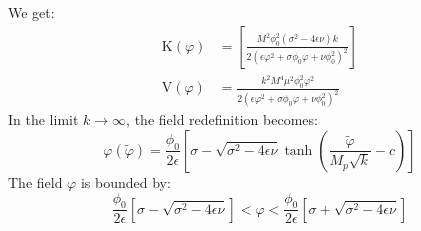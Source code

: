 \documentclass[aps,prd,reprint,preprintnumbers,showpacs,floatfix,nofootinbib,superscript address]{revtex4-2}
\begin{document}
We get:
\begin{align}
    \text{K}(\varphi) &= \left[\frac{M^2 \phi_0^2 (\sigma^2 - 4\epsilon\nu)k}{2 (\epsilon \varphi^2 + \sigma\phi_0\varphi + \nu \phi_0^2)^2}\right] \label{C4}  \\
    \text{V}(\varphi) &= \frac{ k^2 M^4 \mu^2 \phi^2_0 \varphi^2}{2(\epsilon \varphi^2 + \sigma\phi_0\varphi + \nu \phi_0^2)^2}
\end{align}
In the limit $k \rightarrow\infty$, the field redefinition becomes:
\begin{equation}
    \varphi(\tilde{\varphi}) = \frac{\phi_0}{2\epsilon} \left[\sigma - \sqrt{\sigma^2 - 4\epsilon \nu} \tanh\left(\frac{\tilde{\varphi}}{M_p\sqrt{k}}-c \right) \right]
\end{equation}
The field $\varphi$ is bounded by:
\begin{equation}
    \frac{\phi_0}{2\epsilon} \left[\sigma - \sqrt{\sigma^2 - 4\epsilon \nu}\right] < \varphi < \frac{\phi_0}{2\epsilon} \left[\sigma + \sqrt{\sigma^2 - 4\epsilon \nu}  \right]
\end{equation}

\newpage

\printbibliography
\end{document}
